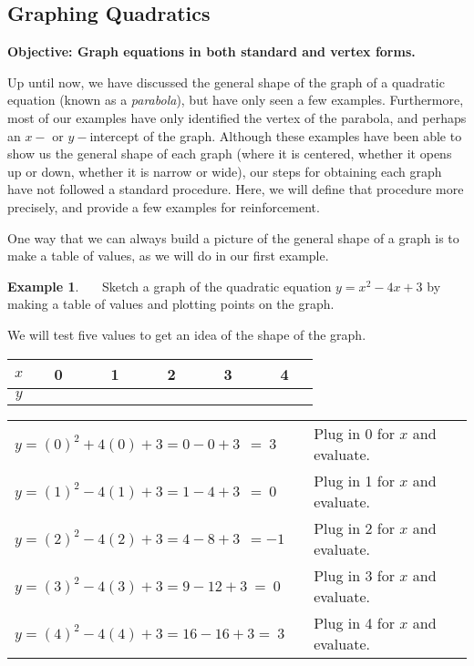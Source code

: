 \documentclass[12pt]{book}
\theoremstyle{definition}
\newtheorem{example}{Example}
\begin{document}
\subsection{Graphing Quadratics}
{\bf Objective: Graph equations in both standard and vertex forms.}\par
Up until now, we have discussed the general shape of the graph of a quadratic equation (known as a \textit{parabola}), but have only seen a few examples.  Furthermore, most of our examples have only identified the vertex of the parabola, and perhaps an $x-$ or $y-$intercept of the graph.  Although these examples have been able to show us the general shape of each graph (where it is centered, whether it opens up or down, whether it is narrow or wide), our steps for obtaining each graph have not followed a standard procedure.  Here, we will define that procedure more precisely, and provide a few examples for reinforcement.\par
One way that we can always build a picture of the general shape of a graph is to make a table of values, as we will do in our first example.
\begin{example}~~~Sketch a graph of the quadratic equation $y = x^2 - 4 x + 3$ by making a table of values and plotting points on the graph.\par
We will test five values to get an idea of the shape of the graph.	
	\begin{center}
	\begin{tabular}{|c|c|c|c|c|c|}
	\hline 
	$x$ & ~~0~~ & ~~1~~ & ~~2~~ & ~~3~~ & ~~4~~\\
	\hline 
	$y$ &  &  &  &  & \\
	\hline
	\end{tabular}
	\end{center}
 \begin{center}
	\begin{tabular}{lcl}
    $y =(0)^2 + 4 (0) + 3=0 - 0 + 3~~=~3$ &&  Plug in 0 for $x$ and evaluate.\\
	$y =(1)^2 - 4 (1) + 3=1 - 4 + 3~~=~0$ &&  Plug in 1 for $x$ and evaluate.\\
    $y =(2)^2 - 4 (2) + 3=4 - 8 + 3~~=- 1$ &&  Plug in 2 for $x$ and evaluate.\\
    $y =(3)^2 - 4 (3) + 3=9 - 12 + 3~=~0$ &&  Plug in 3 for $x$ and evaluate.\\
    $y =(4)^2 - 4 (4) + 3=16 - 16 + 3=~3$ &&  Plug in 4 for $x$ and evaluate.
	\end{tabular}
\end{center}
\end{example}
\end{document}

